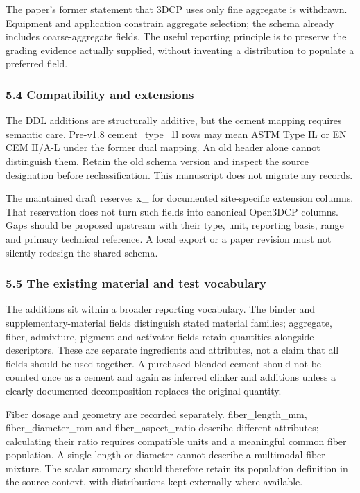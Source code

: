 \documentclass[
  american,
  11pt,
  letterpaper,
]{article}
\renewcommand{\texttt}[1]{{\ttfamily\fontsize{9.5}{11}\selectfont\hyphenchar\font=-1 #1}}
\begin{document}
The paper's former statement that 3DCP uses only fine aggregate is
withdrawn. Equipment and application constrain aggregate selection; the
schema already includes coarse-aggregate fields. The useful reporting
principle is to preserve the grading evidence actually supplied, without
inventing a distribution to populate a preferred field.

\subsubsection{5.4 Compatibility and
extensions}\label{compatibility-and-extensions}

The DDL additions are structurally additive, but the cement mapping
requires semantic care. Pre-v1.8 \texttt{cement\_type\_1l} rows may mean
ASTM Type IL or EN CEM II/A-L under the former dual mapping. An old
header alone cannot distinguish them. Retain the old schema version and
inspect the source designation before reclassification. This manuscript
does not migrate any records.

The maintained draft reserves \texttt{x\_} for documented site-specific
extension columns. That reservation does not turn such fields into
canonical Open3DCP columns. Gaps should be proposed upstream with their
type, unit, reporting basis, range and primary technical reference. A
local export or a paper revision must not silently redesign the shared
schema.

\subsubsection{5.5 The existing material and test
vocabulary}\label{the-existing-material-and-test-vocabulary}

The additions sit within a broader reporting vocabulary. The binder and
supplementary-material fields distinguish stated material families;
aggregate, fiber, admixture, pigment and activator fields retain
quantities alongside descriptors. These are separate ingredients and
attributes, not a claim that all fields should be used together. A
purchased blended cement should not be counted once as a cement and
again as inferred clinker and additions unless a clearly documented
decomposition replaces the original quantity.

Fiber dosage and geometry are recorded separately.
\texttt{fiber\_length\_mm}, \texttt{fiber\_diameter\_mm} and
\texttt{fiber\_aspect\_ratio} describe different attributes; calculating
their ratio requires compatible units and a meaningful common fiber
population. A single length or diameter cannot describe a multimodal
fiber mixture. The scalar summary should therefore retain its population
definition in the source context, with distributions kept externally
where available.
\end{document}
